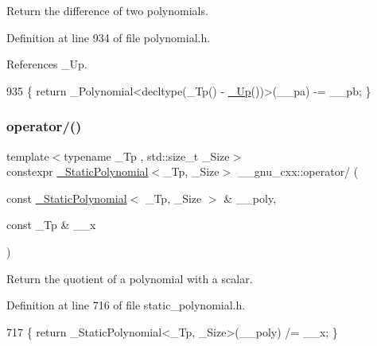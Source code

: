 Return the difference of two polynomials. 

Definition at line 934 of file polynomial.\+h.



References \+\_\+\+Up.


\begin{DoxyCode}
935     \{ \textcolor{keywordflow}{return} \_Polynomial<decltype(\_Tp() - \hyperlink{namespace____gnu__cxx_ab693ea357b6429b331e0bf09f9442385}{\_Up}())>(\_\_pa) -= \_\_pb; \}
\end{DoxyCode}
\mbox{\label{namespace____gnu__cxx_a646b9470b937733c916192c121e8ecdb}} 
\subsubsection{\texorpdfstring{operator/()}{operator/()}\hspace{0.1cm}{\footnotesize\ttfamily [1/5]}}
{\footnotesize\ttfamily template$<$typename \+\_\+\+Tp , std\+::size\+\_\+t \+\_\+\+Size$>$ \\
constexpr \hyperlink{class____gnu__cxx_1_1__StaticPolynomial}{\+\_\+\+Static\+Polynomial}$<$\+\_\+\+Tp, \+\_\+\+Size$>$ \+\_\+\+\_\+gnu\+\_\+cxx\+::operator/ (\begin{DoxyParamCaption}\item[{const \hyperlink{class____gnu__cxx_1_1__StaticPolynomial}{\+\_\+\+Static\+Polynomial}$<$ \+\_\+\+Tp, \+\_\+\+Size $>$ \&}]{\+\_\+\+\_\+poly,  }\item[{const \+\_\+\+Tp \&}]{\+\_\+\+\_\+x }\end{DoxyParamCaption})\hspace{0.3cm}{\ttfamily [inline]}}

Return the quotient of a polynomial with a scalar. 

Definition at line 716 of file static\+\_\+polynomial.\+h.


\begin{DoxyCode}
717     \{ \textcolor{keywordflow}{return} \_StaticPolynomial<\_Tp, \_Size>(\_\_poly) /= \_\_x; \}
\end{DoxyCode}
\mbox{\label{namespace____gnu__cxx_a451a609c6de284cdeed747a994938801}} 

